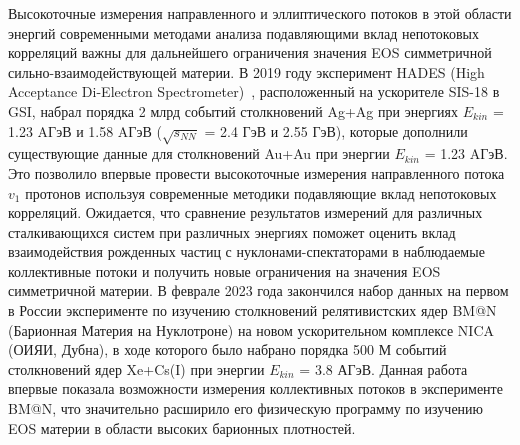 Высокоточные измерения направленного и эллиптического потоков в этой области энергий современными методами анализа подавляющими вклад непотоковых корреляций важны для дальнейшего ограничения значения EOS симметричной сильно-взаимодействующей материи.
В 2019 году эксперимент HADES (High Acceptance Di-Electron Spectrometer)~\cite{HADES:2009aat}, расположенный на ускорителе SIS-18 в GSI, набрал порядка 2 млрд событий столкновений Ag+Ag при энергиях $E_{kin}$ = 1.23 AГэВ и 1.58 AГэВ ($\sqrt{s_{NN}}$ = 2.4 ГэВ и 2.55 ГэВ), которые дополнили существующие данные для столкновений Au+Au при энергии  $E_{kin}$ = 1.23 AГэВ. Это позволило впервые провести высокоточные измерения направленного потока $v_1$ протонов используя современные методики подавляющие вклад непотоковых корреляций.
Ожидается, что сравнение результатов измерений для различных сталкивающихся систем при различных энергиях поможет  оценить вклад взаимодействия рожденных частиц с нуклонами-спектаторами в наблюдаемые коллективные  потоки и получить новые ограничения на значения EOS симметричной материи.
В феврале 2023 года закончился набор данных на первом в России эксперименте по изучению столкновений релятивистских ядер BM@N (Барионная Материя на Нуклотроне) на новом ускорительном комплексе NICA (ОИЯИ, Дубна), в ходе которого было набрано порядка 500 М событий столкновений ядер Xe+Cs(I) при энергии  $E_{kin}$ = 3.8 АГэВ. Данная работа впервые показала возможности измерения коллективных потоков
в эксперименте BM@N,  что значительно расширило его физическую программу по изучению EOS материи  в области высоких барионных плотностей.

